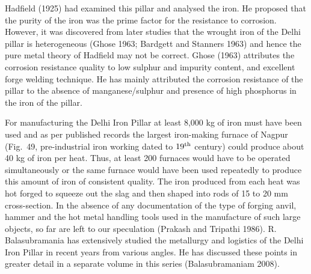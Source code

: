 Hadfield (1925) had examined this pillar and analysed the iron. He proposed that the purity of the iron was the prime factor for the resistance to corrosion. However, it was discovered from later studies that the wrought iron of the Delhi pillar is heterogeneous (Ghose 1963; Bardgett and Stanners 1963) and hence the pure metal theory of Hadfield may not be correct. Ghose (1963) attributes the corrosion resistance quality to low sulphur and impurity content, and excellent forge welding technique. He has mainly attributed the corrosion resistance of the pillar to the absence of manganese/sulphur and presence of high phosphorus in the iron of the pillar.

For manufacturing the Delhi Iron Pillar at least 8,000 kg of iron must have been used and as per published records the largest iron-making furnace of Nagpur (Fig.~49, pre-industrial iron working dated to $19^{\rm th}$ century) could produce about 40 kg of iron per heat. Thus, at least 200 furnaces would have to be operated simultaneously or the same furnace would have been used repeatedly to produce this amount of iron of consistent quality. The iron produced from each heat was hot­ forged to squeeze out the slag and then shaped into rods of 15 to 20 mm cross-section. In the absence of any documentation of the type of forging anvil, hammer and the hot metal handling tools used in the manufacture of such large objects, so far are left to our speculation (Prakash and Tripathi 1986). R. Balasubramania has extensively studied the metallurgy and logistics of the Delhi Iron Pillar in recent years from various angles. He has discussed these points in greater detail in a separate volume in this series (Balasubramaniam 2008).

